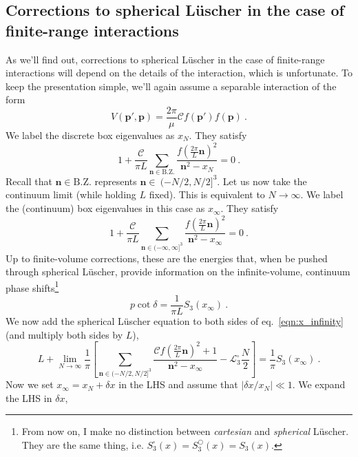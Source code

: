 \documentclass[11pt]{article}
\begin{document}
\subsection{Corrections to spherical L\"uscher in the case of finite-range interactions}
As we'll find out, corrections to spherical L\"uscher in the case of finite-range interactions will depend on the details of the interaction, which is unfortunate.  To keep the presentation simple, we'll again assume a separable interaction of the form
\begin{equation}
V(\bm p',\bm p)=\frac{2\pi}{\mu} \mathcal{C} f(\bm p')f(\bm p)\ .
\end{equation}
We label the discrete box eigenvalues as $x_N$.  They satisfy
\begin{equation}\label{eqn:x_N}
1+\frac{\mathcal{C}}{\pi L}\sum_{\bm n\in\mathrm{B.Z.}}\frac{f\left(\frac{2\pi}{L}\bm n\right)^2}{\bm n^2-x_N}=0\ .
\end{equation}
Recall that $\bm n\in\mathrm{B.Z.}$ represents $\bm n\in\ (-N/2,N/2]^3$.  Let us now take the continuum limit (while holding $L$ fixed).  This is equivalent to $N\to \infty$.  We label the (continuum) box eigenvalues in this case as $x_\infty$.  They satisfy
\begin{equation}\label{eqn:x_infinity}
1+\frac{\mathcal{C}}{\pi L}\sum_{\bm n\in(-\infty,\infty]^3}\frac{f\left(\frac{2\pi}{L}\bm n\right)^2}{\bm n^2-x_\infty}=0\ .
\end{equation}
Up to finite-volume corrections, these are the energies that, when be pushed through spherical L\"uscher, provide information on the infinite-volume, continuum phase shifts\footnote{From now on, I make no distinction between \emph{cartesian} and \emph{spherical} L\"uscher.  They are the same thing, i.e. $S^\square_3(x)=S^\bigcirc_3(x)=S_3(x)$.}
\begin{equation}
p\cot\delta=\frac{1}{\pi L}S_3(x_\infty)\ .
\end{equation}
We now add the spherical L\"uscher equation to both sides of eq.~\eqref{eqn:x_infinity} (and multiply both sides by $L$),
\begin{equation}\label{eqn:x_infinity 2}
L+\lim_{N\to\infty}\frac{1}{\pi}\left[\sum_{\bm n\in(-N/2,N/2]^3}\frac{\mathcal{C}f\left(\frac{2\pi}{L}\bm n\right)^2+1}{\bm n^2-x_\infty}-\mathcal{L}^\square_3\frac{N}{2}\right]=\frac{1}{\pi}S_3(x_\infty)\ .
\end{equation}
Now we set $x_\infty=x_N+\delta x$ in the LHS and assume that $|\delta x/x_N|\ll 1$.  We expand the LHS in $\delta x$,
\end{document}
